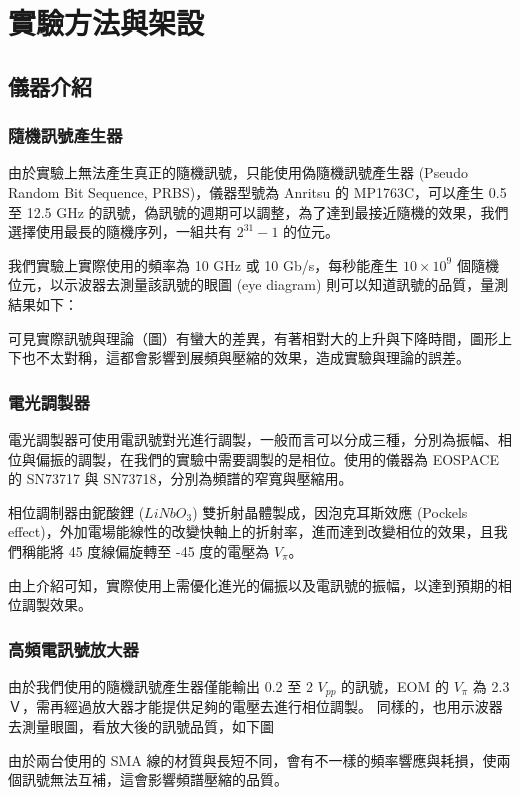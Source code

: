 \documentclass[class=NCU_thesis, crop=false]{standalone}
\begin{document}
\chapter{實驗方法與架設}
\section{儀器介紹}
\subsection{隨機訊號產生器}
由於實驗上無法產生真正的隨機訊號，只能使用偽隨機訊號產生器 (Pseudo Random Bit Sequence, PRBS)，儀器型號為 Anritsu 的 MP1763C，可以產生 0.5 至 12.5 GHz 的訊號，偽訊號的週期可以調整，為了達到最接近隨機的效果，我們選擇使用最長的隨機序列，一組共有 $2^{31}-1$ 的位元。

我們實驗上實際使用的頻率為 10 GHz 或 10 Gb/s，每秒能產生 $10\times 10^{9}$ 個隨機位元，以示波器去測量該訊號的眼圖 (eye diagram) 則可以知道訊號的品質，量測結果如下：

可見實際訊號與理論（圖）有蠻大的差異，有著相對大的上升與下降時間，圖形上下也不太對稱，這都會影響到展頻與壓縮的效果，造成實驗與理論的誤差。

\subsection{電光調製器}
電光調製器可使用電訊號對光進行調製，一般而言可以分成三種，分別為振幅、相位與偏振的調製，在我們的實驗中需要調製的是相位。使用的儀器為 EOSPACE 的 SN73717 與 SN73718，分別為頻譜的窄寬與壓縮用。

相位調制器由鈮酸鋰 ($LiNbO_{3}$) 雙折射晶體製成，因泡克耳斯效應 (Pockels effect)，外加電場能線性的改變快軸上的折射率，進而達到改變相位的效果，且我們稱能將 45 度線偏旋轉至 -45 度的電壓為 $V_{\pi}$。

由上介紹可知，實際使用上需優化進光的偏振以及電訊號的振幅，以達到預期的相位調製效果。

\subsection{高頻電訊號放大器}
由於我們使用的隨機訊號產生器僅能輸出 0.2 至 2 $V_{pp}$ 的訊號，EOM 的 $V_{\pi}$ 為 2.3 Ｖ，需再經過放大器才能提供足夠的電壓去進行相位調製。
同樣的，也用示波器去測量眼圖，看放大後的訊號品質，如下圖

由於兩台使用的 SMA 線的材質與長短不同，會有不一樣的頻率響應與耗損，使兩個訊號無法互補，這會影響頻譜壓縮的品質。
\end{document}
